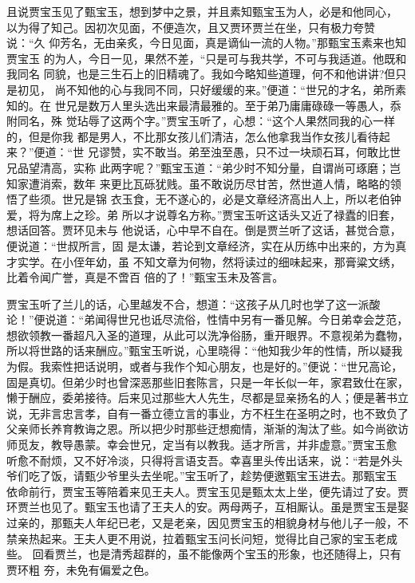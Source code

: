 且说贾宝玉见了甄宝玉，想到梦中之景，并且素知甄宝玉为人，必是和他同心，
以为得了知己。因初次见面，不便造次，且又贾环贾兰在坐，只有极力夸赞说：“久
仰芳名，无由亲炙，今日见面，真是谪仙一流的人物。”那甄宝玉素来也知贾宝玉
的为人，今日一见，果然不差，“只是可与我共学，不可与我适道。他既和我同名
同貌，也是三生石上的旧精魂了。我如今略知些道理，何不和他讲讲?但只是初见，
尚不知他的心与我同不同，只好缓缓的来。”便道：“世兄的才名，弟所素知的。在
世兄是数万人里头选出来最清最雅的。至于弟乃庸庸碌碌一等愚人，忝附同名，殊
觉玷辱了这两个字。”贾宝玉听了，心想：“这个人果然同我的心一样的，但是你我
都是男人，不比那女孩儿们清洁，怎么他拿我当作女孩儿看待起来？”便道：“世
兄谬赞，实不敢当。弟至浊至愚，只不过一块顽石耳，何敢比世兄品望清高，实称
此两字呢？”甄宝玉道：“弟少时不知分量，自谓尚可琢磨；岂知家遭消索，数年
来更比瓦砾犹贱。虽不敢说历尽甘苦，然世道人情，略略的领悟了些须。世兄是锦
衣玉食，无不遂心的，必是文章经济高出人上，所以老伯钟爱，将为席上之珍。弟
所以才说尊名方称。”贾宝玉听这话头又近了禄蠹的旧套，想话回答。贾环见未与
他说话，心中早不自在。倒是贾兰听了这话，甚觉合意，便说道：“世叔所言，固
是太谦，若论到文章经济，实在从历练中出来的，方为真才实学。在小侄年幼，虽
不知文章为何物，然将读过的细味起来，那膏粱文绣，比着令闻广誉，真是不啻百
倍的了！”甄宝玉未及答言。

贾宝玉听了兰儿的话，心里越发不合，想道：“这孩子从几时也学了这一派酸
论！”便说道：“弟闻得世兄也诋尽流俗，性情中另有一番见解。今日弟幸会芝范，
想欲领教一番超凡入圣的道理，从此可以洗净俗肠，重开眼界。不意视弟为蠢物，
所以将世路的话来酬应。”甄宝玉听说，心里晓得：“他知我少年的性情，所以疑我
为假。我索性把话说明，或者与我作个知心朋友，也是好的。”便说：“世兄高论，
固是真切。但弟少时也曾深恶那些旧套陈言，只是一年长似一年，家君致仕在家，
懒于酬应，委弟接待。后来见过那些大人先生，尽都是显亲扬名的人；便是著书立
说，无非言忠言孝，自有一番立德立言的事业，方不枉生在圣明之时，也不致负了
父亲师长养育教诲之恩。所以把少时那些迂想痴情，渐渐的淘汰了些。如今尚欲访
师觅友，教导愚蒙。幸会世兄，定当有以教我。适才所言，并非虚意。”贾宝玉愈
听愈不耐烦，又不好冷淡，只得将言语支吾。幸喜里头传出话来，说：“若是外头
爷们吃了饭，请甄少爷里头去坐呢。”宝玉听了，趁势便邀甄宝玉进去。那甄宝玉
依命前行，贾宝玉等陪着来见王夫人。贾宝玉见是甄太太上坐，便先请过了安。贾
环贾兰也见了。甄宝玉也请了王夫人的安。两母两子，互相厮认。虽是贾宝玉是娶
过亲的，那甄夫人年纪已老，又是老亲，因见贾宝玉的相貌身材与他儿子一般，不
禁亲热起来。王夫人更不用说，拉着甄宝玉问长问短，觉得比自己家的宝玉老成些。
回看贾兰，也是清秀超群的，虽不能像两个宝玉的形象，也还随得上，只有贾环粗
夯，未免有偏爱之色。

